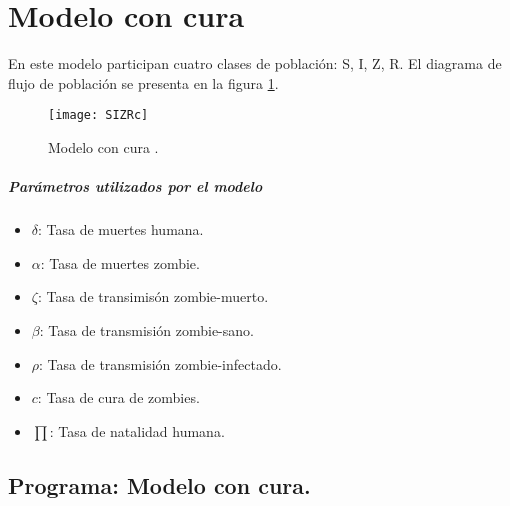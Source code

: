 \documentclass[12pt]{article}
\begin{document}
\section{Modelo con cura}
En este modelo participan cuatro clases de población: S, I, Z, R. El diagrama de flujo de población se presenta en la figura \ref{SIZRc}.

\begin{figure}[H]
\centering
 \texttt{[image: SIZRc]}
 \caption{Modelo con cura \cite{Z}.}
 \label{SIZRc}
\end{figure}

\subparagraph*{Parámetros utilizados por el modelo}
\begin{itemize}
\item $\delta$: Tasa de muertes humana.
\item $\alpha$: Tasa de muertes zombie.
\item $\zeta$: Tasa de transimisón zombie-muerto.
\item $\beta$: Tasa de transmisión zombie-sano.
\item $\rho$: Tasa de transmisión zombie-infectado.
\item $c$: Tasa de cura de zombies.
\item $\prod$: Tasa de natalidad humana.
\end{itemize}

\subsection*{Programa: Modelo con cura.}
\end{document}
